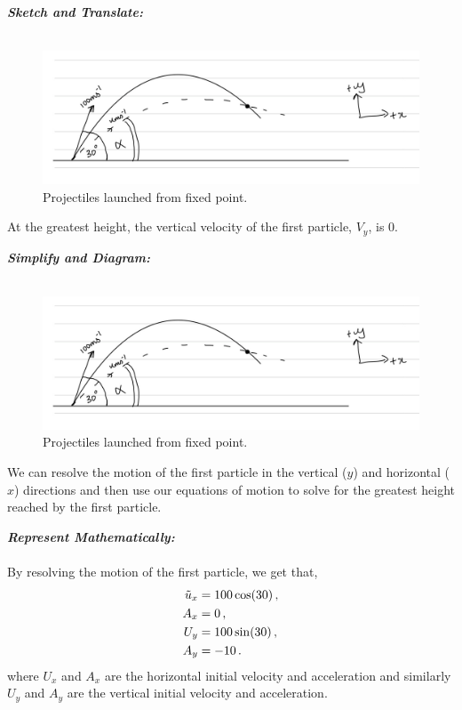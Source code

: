 \begin{subquestions}
	
\subquestion

\textbf{\textit{Sketch and Translate:}} \\ \\
\begin{figure}[H]
	\begin{center}
		\includegraphics[scale=0.25]{../2008/figures/2008Jq6-1}
		\caption{\label{2008J:q6:Sketch1} Projectiles launched from fixed point.}
	\end{center}
\end{figure}
At the greatest height, the vertical velocity of the first particle, $V_y$, is 0.




\textbf{\textit{Simplify and Diagram:}} \\ \\
\begin{figure}[H]
	\begin{center}
		\includegraphics[scale=0.25]{../2008/figures/2008Jq6-1}
		\caption{\label{2008J:q6:Diagram1} Projectiles launched from fixed point.}
	\end{center}
\end{figure}
We can resolve the motion of the first particle in the vertical ($y$) and horizontal ($x$) directions and then use our equations of motion to solve for the greatest height reached by the first particle. 




\textbf{\textit{Represent Mathematically:}} \\ \\
By resolving the motion of the first particle, we get that,
\begin{align}
	\tilde{u}_x & = 100 \cos(30) \,, \nonumber \\
	A_x & = 0 \,, \nonumber \\
	U_y & = 100 \sin(30) \,, \nonumber \\
	A_y & = -10 \,. 
\end{align}
where $U_x$ and $A_x$ are the horizontal initial velocity and acceleration and similarly $U_y$ and $A_y$ are the vertical initial velocity and acceleration.


\end{subquestions}
